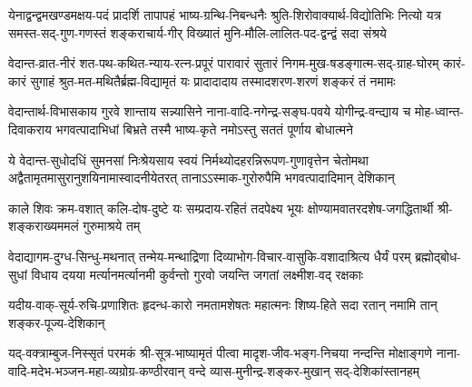 
\fourlineindentedshloka
{येनाद्वन्द्वमखण्डमक्षय-पदं प्रादर्शि तापापहं}
{भाष्य-ग्रन्थि-निबन्धनैः श्रुति-शिरोवाक्यार्थ-विद्योतिभिः}
{नित्यो यत्र समस्त-सद्-गुण-गणस्तं शङ्कराचार्य-गीर्}
{विख्यातं मुनि-मौलि-लालित-पद-द्वन्द्वं सदा संश्रये}


\fourlineindentedshloka
{वेदान्त-व्रात-नीरं शत-पथ-कथित-न्याय-रत्न-प्रपूरं}
{पारावारं सुतारं निगम-मुख-षडङ्गात्म-सद्-ग्राह-घोरम्}
{कारं-कारं सुगाहं श्रुत-मत-मथितैर्ब्रह्म-विद्यामृतं यः}
{प्रादादादाय तस्मादशरण-शरणं शङ्करं तं नमामः}


\fourlineindentedshloka
{वेदान्तार्थ-विभासकाय गुरवे शान्ताय सन्न्यासिने}
{नाना-वादि-नगेन्द्र-सङ्घ-पवये योगीन्द्र-वन्द्याय च}
{मोह-ध्वान्त-दिवाकराय भगवत्पादाभिधां बिभ्रते}
{तस्मै भाष्य-कृते नमोऽस्तु सततं पूर्णाय बोधात्मने}


\fourlineindentedshloka
{ये वेदान्त-सुधोदधिं सुमनसां निःश्रेयसाय स्वयं}
{निर्मथ्योदहरन्निरूपण-गुणावृत्तेन चेतोमथा}
{अद्वैतामृतमासुरानुशयिनामास्वादनीयेतरत्}
{तानाऽऽस्माक-गुरोरुपैमि भगवत्पादादिमान् देशिकान्}


\fourlineindentedshloka
{काले शिवः क्रम-वशात् कलि-दोष-दुष्टे}
{यः सम्प्रदाय-रहितं तदपेक्ष्य भूयः}
{क्षोण्यामवातरदशेष-जगद्धितार्थी}
{श्री-शङ्कराख्यममलं गुरुमाश्रये तम्}


\fourlineindentedshloka
{वेदाद्यागम-दुग्ध-सिन्धु-मथनात् तन्मेय-मन्थाद्रिणा}
{दिव्याभोग-विचार-वासुकि-वशादाश्रित्य धैर्यं परम्}
{ब्रह्मोद्बोध-सुधां विधाय दयया मर्त्यानमर्त्यानमी}
{कुर्वन्तो गुरवो जयन्ति जगतां लक्ष्मीश-वद् रक्षकाः}


\fourlineindentedshloka
{यदीय-वाक्-सूर्य-रुचि-प्रणाशितः}
{हृदन्ध-कारो नमतामशेषतः}
{महात्मनः शिष्य-हिते सदा रतान्}
{नमामि तान् शङ्कर-पूज्य-देशिकान्}


\fourlineindentedshloka
{यद्-वक्त्राम्बुज-निस्सृतं परमकं श्री-सूत्र-भाष्यामृतं}
{पीत्वा मादृश-जीव-भङ्ग-निचया नन्दन्ति मोक्षाङ्गणे}
{नाना-वादि-मदेभ-भञ्जन-महा-व्यग्रोग्र-कण्ठीरवान्}
{वन्दे व्यास-मुनीन्द्र-शङ्कर-मुखान् सद्-देशिकांस्तानहम्}

